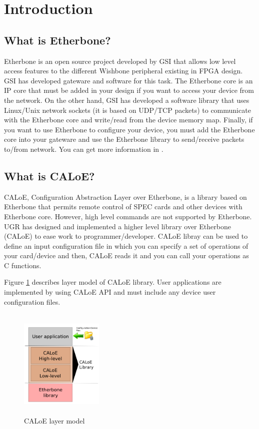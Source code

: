 \section{Introduction}

\subsection{What is Etherbone?}

Etherbone is an open source project developed by GSI \cite{gsi} that allows low level access features to the different Wishbone peripheral existing in FPGA design. GSI has developed gateware and software for this task. The Etherbone core is an IP core that must be added in your design if you want to access your device from the network. On the other hand, GSI has developed a software library that uses Linux/Unix network sockets (it is based on UDP/TCP packets) to communicate with the Etherbone core and write/read from the device memory map. 
Finally, if you want to use Etherbone to configure your device, you must add the Etherbone core into your gateware and use the Etherbone library to send/receive packets to/from network. You can get more information in \cite{Etherbone-repo}. 

\subsection{What is CALoE?}

CALoE, Configuration Abstraction Layer over Etherbone, is a library based on Etherbone that permits remote control of SPEC cards \cite{Spec-board} and other devices with Etherbone core.
However, high level commands are not supported by Etherbone. UGR has designed and implemented a higher level library over Etherbone (CALoE) to ease work to programmer/developer. CALoE libray can be used to define an input configuration file in which you can specify a set of operations 
of your card/device and then, CALoE reads it and you can call your operations as C functions. 

Figure \ref{caloe_layer_model_img} describes layer model of CALoE library. User applications are implemented by using CALoE API and must include any device user configuration files.

\begin{figure}[H]
\centering
\includegraphics[width=150px,height=200px]{img/layer_model.png}
\caption{CALoE layer model}
\label{caloe_layer_model_img}
\end{figure}

